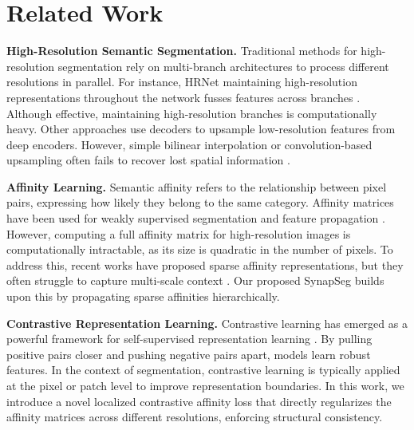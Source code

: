 \section{Related Work}
\textbf{High-Resolution Semantic Segmentation.} Traditional methods for high-resolution segmentation rely on multi-branch architectures to process different resolutions in parallel. For instance, HRNet maintaining high-resolution representations throughout the network fusses features across branches \cite{lee2023dual}. Although effective, maintaining high-resolution branches is computationally heavy. Other approaches use decoders to upsample low-resolution features from deep encoders. However, simple bilinear interpolation or convolution-based upsampling often fails to recover lost spatial information \cite{taylor2021efficient}.

\textbf{Affinity Learning.} Semantic affinity refers to the relationship between pixel pairs, expressing how likely they belong to the same category. Affinity matrices have been used for weakly supervised segmentation and feature propagation \cite{garcia2020attention}. However, computing a full affinity matrix for high-resolution images is computationally intractable, as its size is quadratic in the number of pixels. To address this, recent works have proposed sparse affinity representations, but they often struggle to capture multi-scale context \cite{jenkins2024affinity}. Our proposed SynapSeg builds upon this by propagating sparse affinities hierarchically.

\textbf{Contrastive Representation Learning.} Contrastive learning has emerged as a powerful framework for self-supervised representation learning \cite{chen2023contrastive}. By pulling positive pairs closer and pushing negative pairs apart, models learn robust features. In the context of segmentation, contrastive learning is typically applied at the pixel or patch level to improve representation boundaries. In this work, we introduce a novel localized contrastive affinity loss that directly regularizes the affinity matrices across different resolutions, enforcing structural consistency.
